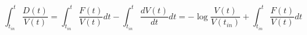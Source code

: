 \begin{equation}
\int_{t_{in}}^t \frac{D(t)}{V(t)}=\int_{t_{in}}^t \frac{F(t)}{V(t)} dt - \int_{t_{in}}^t \frac{dV(t)}{dt} dt = -\log \frac{V(t)}{V(t_{in})}+ \int_{t_{in}}^t \frac{F(t)}{V(t)} dt
\end{equation}